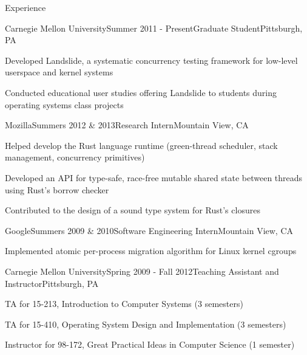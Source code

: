 \documentclass{resume} %
\begin{document}
\begin{rSection}{Experience}

\begin{rSubsection}{Carnegie Mellon University}{Summer 2011 - Present}{Graduate Student}{Pittsburgh, PA}
\item Developed Landslide, a systematic concurrency testing framework for low-level userspace and kernel systems
\item Conducted educational user studies offering Landslide to students during operating systems class projects
\end{rSubsection}

\begin{rSubsection}{Mozilla}{Summers 2012 \& 2013}{Research Intern}{Mountain View, CA}
\item Helped develop the Rust language runtime (green-thread scheduler, stack management, concurrency primitives)
\item Developed an API for type-safe, race-free mutable shared state between threads using Rust's borrow checker
\item Contributed to the design of a sound type system for Rust's closures
\end{rSubsection}

\begin{rSubsection}{Google}{Summers 2009 \& 2010}{Software Engineering Intern}{Mountain View, CA}
\item Implemented atomic per-process migration algorithm for Linux kernel cgroups
\end{rSubsection}

\begin{rSubsection}{Carnegie Mellon University}{Spring 2009 - Fall 2012}{Teaching Assistant and Instructor}{Pittsburgh, PA}
\item TA for 15-213, Introduction to Computer Systems (3 semesters)
\item TA for 15-410, Operating System Design and Implementation (3 semesters)
\item Instructor for 98-172, Great Practical Ideas in Computer Science (1 semester)
\end{rSubsection}

\end{rSection}

\end{document}
